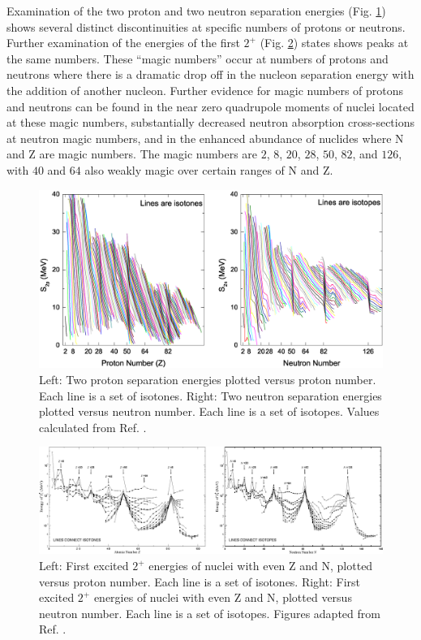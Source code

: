 Examination of the two proton and two neutron separation energies (Fig. \ref{fig:chp2-masses}) shows several distinct discontinuities at specific numbers of protons or neutrons. Further examination of the energies of the first $2^+$ (Fig. \ref{fig:chp2-two-plus-energies}) states shows peaks at the same numbers. These ``magic numbers'' occur at numbers of protons and neutrons where there is a dramatic drop off in the nucleon separation energy with the addition of another nucleon. Further evidence for magic numbers of protons and neutrons can be found in the near zero quadrupole moments of nuclei located at these magic numbers, substantially decreased neutron absorption cross-sections at neutron magic numbers, and in the enhanced abundance of nuclides where N and Z are magic numbers. The magic numbers are $2$, $8$, $20$, $28$, $50$, $82$, and $126$, with $40$ and $64$ also weakly magic over certain ranges of N and Z.

\begin{figure}[h!]
\centerline{\includegraphics[width=\textwidth]{./img/c2/2nuc_sep_en.eps}}
	\caption{Left: Two proton separation energies plotted versus proton number. Each line is a set of isotones. Right: Two neutron separation energies plotted versus neutron number. Each line is a set of isotopes. Values calculated from Ref. \cite{AME20031,AME20032}.\label{fig:chp2-masses}}
\end{figure}

\begin{figure}[h!]
\centerline{\includegraphics[width=\textwidth]{./img/c2/2_plus_en.eps}}
	\caption{Left: First excited $2^+$ energies of nuclei with even Z and N, plotted versus proton number. Each line is a set of isotones. Right: First excited $2^+$ energies of nuclei with even Z and N, plotted versus neutron number. Each line is a set of isotopes. Figures adapted from Ref. \cite{RamanTwoPlus}.\label{fig:chp2-two-plus-energies}}
\end{figure}

